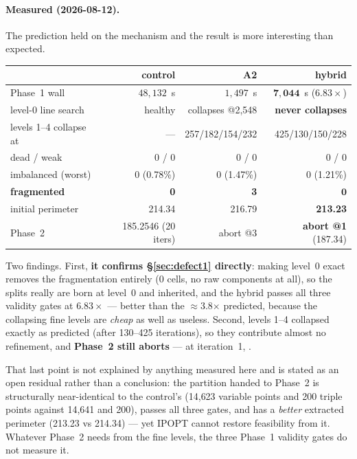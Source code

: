 \documentclass[11pt,a4paper]{article}
\begin{document}
\paragraph{Measured (2026-08-12).} The prediction held on the mechanism and the
result is more interesting than expected.

\begin{center}
\begin{tabular}{@{}lrrr@{}}
\toprule
 & control & A2 & hybrid \\
\midrule
Phase~1 wall & \(48{,}132\)~s & \(1{,}497\)~s & \(\mathbf{7{,}044}\)~s (\(6.83\times\)) \\
level-0 line search & healthy & collapses @2{,}548 & \textbf{never collapses} \\
levels 1--4 collapse at & --- & 257/182/154/232 & 425/130/150/228 \\
dead / weak & 0 / 0 & 0 / 0 & 0 / 0 \\
imbalanced (worst) & 0 (0.78\%) & 0 (1.47\%) & 0 (1.21\%) \\
\textbf{fragmented} & \textbf{0} & \textbf{3} & \(\mathbf{0}\) \\
initial perimeter & 214.34 & 216.79 & \textbf{213.23} \\
Phase~2 & 185.2546 (20 iters) & abort @3 & \textbf{abort @1} (187.34) \\
\bottomrule
\end{tabular}
\end{center}

Two findings. First, \textbf{it confirms \S\ref{sec:defect1} directly}: making
level~0 exact removes the fragmentation entirely (\(0\) cells, no raw components
at all), so the splits really are born at level~0 and inherited, and the hybrid
passes all three validity gates at \(6.83\times\) --- better than the
\(\approx\)3.8\(\times\) predicted, because the collapsing fine levels are
\emph{cheap} as well as useless. Second, levels 1--4 collapsed exactly as
predicted (after 130--425 iterations), so they contribute almost no refinement,
and \textbf{Phase~2 still aborts} --- at iteration~1, .

That last point is not explained by anything measured here and is stated as an
open residual rather than a conclusion: the partition handed to Phase~2 is
structurally near-identical to the control's (14{,}623 variable points and 200
triple points against 14{,}641 and 200), passes all three gates, and has a
\emph{better} extracted perimeter (213.23 vs 214.34) --- yet IPOPT cannot restore
feasibility from it. Whatever Phase~2 needs from the fine levels, the three
Phase~1 validity gates do not measure it.
\end{document}
